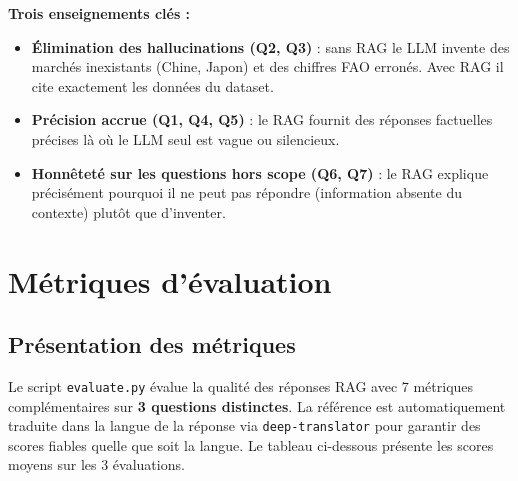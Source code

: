\documentclass[12pt,a4paper]{report}
\begin{document}
\vspace{8pt}
\begin{infobox}
\textbf{Trois enseignements clés :}
\begin{itemize}[leftmargin=1cm]
  \item \textbf{Élimination des hallucinations (Q2, Q3)} : sans RAG le LLM invente
        des marchés inexistants (Chine, Japon) et des chiffres FAO erronés.
        Avec RAG il cite exactement les données du dataset.
  \item \textbf{Précision accrue (Q1, Q4, Q5)} : le RAG fournit des réponses
        factuelles précises là où le LLM seul est vague ou silencieux.
  \item \textbf{Honnêteté sur les questions hors scope (Q6, Q7)} : le RAG
        explique précisément pourquoi il ne peut pas répondre
        (information absente du contexte) plutôt que d'inventer.
\end{itemize}
\end{infobox}

\chapter{Métriques d'évaluation}

\section{Présentation des métriques}

Le script \texttt{evaluate.py} évalue la qualité des réponses RAG avec
7 métriques complémentaires sur \textbf{3 questions distinctes}. La référence
est automatiquement traduite dans la langue de la réponse via
\texttt{deep-translator} pour garantir des scores fiables quelle que soit
la langue. Le tableau ci-dessous présente les scores moyens sur les 3 évaluations.
\end{document}
